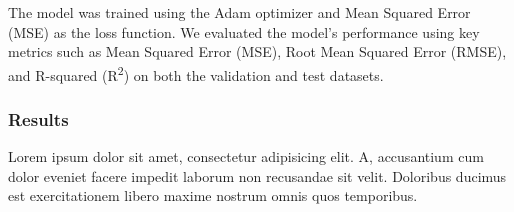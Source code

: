 The model was trained using the Adam optimizer and Mean Squared Error (MSE) as the loss function.
We evaluated the model's performance using key metrics such as Mean Squared Error (MSE), Root Mean Squared Error (RMSE), and R-squared (R\textsuperscript{2}) on both the validation and test datasets.

\subsubsection{Results}

Lorem ipsum dolor sit amet, consectetur adipisicing elit. A, accusantium cum dolor eveniet facere impedit laborum non recusandae sit velit. Doloribus ducimus est exercitationem libero maxime nostrum omnis quos temporibus.
